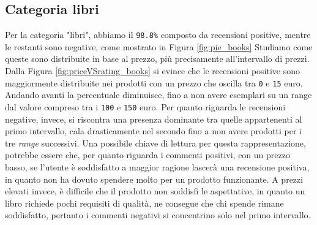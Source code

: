 			\subsection{Categoria libri}
				Per la categoria "libri", abbiamo il \verb|98.8%| composto da recensioni positive, mentre le restanti sono negative, come mostrato in Figura \ref{fig:pie_books}
				Studiamo come queste sono distribuite in base al prezzo, più precisamente all'intervallo di prezzi. \\
				Dalla Figura \ref{fig:priceVSrating_books} si evince che le recensioni positive sono maggiormente distribuite nei prodotti con un prezzo che oscilla tra \verb|0| e \verb|15| euro. Andando avanti la percentuale diminuisce, fino a non avere esemplari su un range dal valore compreso tra i \verb|100| e \verb|150| euro. Per quanto riguarda le recensioni negative, invece, si riscontra una presenza dominante tra quelle appartenenti al primo intervallo, cala drasticamente nel secondo fino a non avere prodotti per i tre \textit{range} successivi. Una possibile chiave di lettura per questa rappresentazione, potrebbe essere che, per quanto riguarda i commenti positivi, con un prezzo basso, se l'utente è soddisfatto a maggior ragione lascerà una recensione positiva, in quanto non ha dovuto spendere molto per un prodotto funzionante. A prezzi elevati invece, è difficile che il prodotto non soddisfi le aspettative, in quanto un libro richiede pochi requisiti di qualità, ne consegue che chi spende rimane soddisfatto, pertanto i commenti negativi si concentrino solo nel primo intervallo.
					

